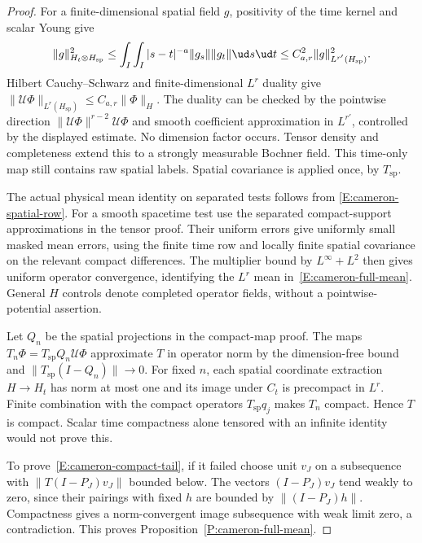 \begin{proof}
  For a finite-dimensional spatial field $g$, positivity of the time
  kernel and scalar Young give
  \[
    \|g\|_{H_t\otimes H_{\mathrm{sp}}}^2
    \le\int_I\int_I|s-t|^{-a}\|g_s\|\|g_t\|\ud s\ud t
    \le C_{a,r}^2\|g\|_{L^{r'}(H_{\mathrm{sp}})}^2.
  \]
  Hilbert Cauchy--Schwarz and finite-dimensional $L^r$ duality give
  $\|\mathcal U\Phi\|_{L^r(H_{\mathrm{sp}})}\le C_{a,r}\|\Phi\|_H$.
  The duality can be checked by the pointwise direction
  $\|\mathcal U\Phi\|^{r-2}\mathcal U\Phi$ and smooth coefficient
  approximation in $L^{r'}$, controlled by the displayed estimate.
  No dimension factor occurs. Tensor density and completeness
  extend this to a strongly measurable Bochner field.
  This time-only map still contains raw spatial labels.
  Spatial covariance is applied once, by $T_{\mathrm{sp}}$.

  The actual physical mean identity on separated tests follows from
  \eqref{E:cameron-spatial-row}. For a smooth spacetime test use
  the separated compact-support approximations in the tensor proof.
  Their uniform errors give uniformly small masked mean errors,
  using the finite time row and locally finite spatial covariance
  on the relevant compact differences. The multiplier bound by
  $L^\infty+L^2$ then gives uniform operator convergence,
  identifying the $L^r$ mean in~\eqref{E:cameron-full-mean}.
  General $H$ controls denote completed operator fields, without a
  pointwise-potential assertion.

  Let $Q_n$ be the spatial projections in the compact-map proof.
  The maps $T_n\Phi=T_{\mathrm{sp}}Q_n\mathcal U\Phi$ approximate
  $T$ in operator norm by the dimension-free bound and
  $\|T_{\mathrm{sp}}(I-Q_n)\|\to0$.
  For fixed $n$, each spatial coordinate extraction $H\to H_t$
  has norm at most one and its image under $C_t$ is precompact
  in $L^r$. Finite combination with the compact operators
  $T_{\mathrm{sp}}q_j$ makes $T_n$ compact.
  Hence $T$ is compact. Scalar time compactness alone tensored
  with an infinite identity would not prove this.

  To prove~\eqref{E:cameron-compact-tail}, if it failed choose
  unit $v_J$ on a subsequence with $\|T(I-P_J)v_J\|$ bounded below.
  The vectors $(I-P_J)v_J$ tend weakly to zero, since their
  pairings with fixed $h$ are bounded by $\|(I-P_J)h\|$.
  Compactness gives a norm-convergent image subsequence with
  weak limit zero, a contradiction.
  This proves Proposition~\ref{P:cameron-full-mean}.
\end{proof}

